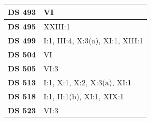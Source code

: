 \begin{xltabular}{\linewidth}{ l | X }
    \textbf {DS 493} & VI \\ \hline 
    
    \textbf {DS 495} & XXIII:1 \\ \hline 
    
    \textbf {DS 499} & I:1, III:4, X:3(a), XI:1, XIII:1 \\ \hline 
    
    \textbf {DS 504} & VI \\ \hline 
    
    \textbf {DS 505} & VI:3 \\ \hline 
    
    \textbf {DS 513} & I:1, X:1, X:2, X:3(a), XI:1 \\ \hline 
    
    \textbf {DS 518} & I:1, II:1(b), XI:1, XIX:1 \\ \hline 
    
    \textbf {DS 523} & VI:3 \\ \hline 
    
    \hline

\end{xltabular}